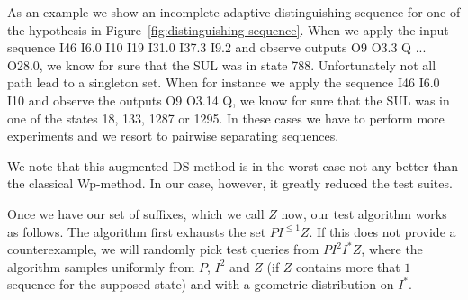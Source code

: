 As an example we show an incomplete adaptive distinguishing sequence for one of
the hypothesis in Figure~\ref{fig:distinguishing-sequence}. When we apply the
input sequence I46 I6.0 I10 I19 I31.0 I37.3 I9.2 and observe outputs O9 O3.3 Q ...
O28.0, we know for sure that the SUL was in state 788. Unfortunately not all
path lead to a singleton set. When for instance we apply the sequence I46 I6.0
I10 and observe the outputs O9 O3.14 Q, we know for sure that the SUL was in one
of the states 18, 133, 1287 or 1295. In these cases we have to perform more
experiments and we resort to pairwise separating sequences.

We note that this augmented DS-method is in the worst case not any better than
the classical Wp-method. In our case, however, it greatly reduced the test
suites.

Once we have our set of suffixes, which we call $Z$ now, our test algorithm
works as follows. The algorithm first exhausts the set $P I^{\leq 1} Z$. If this
does not provide a counterexample, we will randomly pick test queries from $P
I^2 I^\ast Z$, where the algorithm samples uniformly from $P$, $I^2$ and $Z$ (if
$Z$ contains more that $1$ sequence for the supposed state) and with a geometric
distribution on $I^\ast$.
